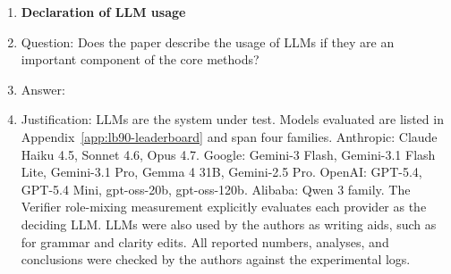 \begin{enumerate}
\item {\bf Declaration of LLM usage}
    \item[] Question: Does the paper describe the usage of LLMs if they are an important component of the core methods?
    \item[] Answer: \answerYes{}
    \item[] Justification: LLMs are the system under test. Models evaluated are listed in Appendix~\ref{app:lb90-leaderboard} and span four families. Anthropic: Claude Haiku 4.5, Sonnet 4.6, Opus 4.7. Google: Gemini-3 Flash, Gemini-3.1 Flash Lite, Gemini-3.1 Pro, Gemma 4 31B, Gemini-2.5 Pro. OpenAI: GPT-5.4, GPT-5.4 Mini, gpt-oss-20b, gpt-oss-120b. Alibaba: Qwen 3 family. The Verifier role-mixing measurement explicitly evaluates each provider as the deciding LLM. LLMs were also used by the authors as writing aids, such as for grammar and clarity edits. All reported numbers, analyses, and conclusions were checked by the authors against the experimental logs.
\end{enumerate}
